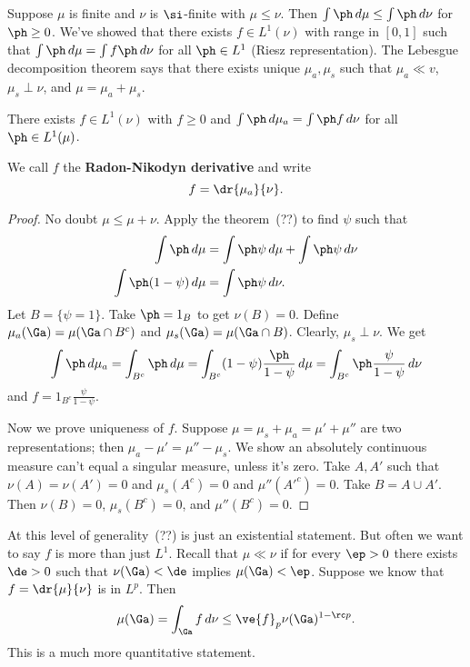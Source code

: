 
\subsection{}
Suppose $\mu$ is finite and $\nu$ is $\si$-finite with $\mu\le \nu$. Then $\int \ph\,d\mu\le \int \ph \,d\nu$ for $\ph\ge 0$. We've showed that there exists $f\in L^1(\nu)$ with range in $[0,1]$ such that $\int \ph\,d\mu=\int f\ph \,d\nu$ for all $\ph\in L^1$ (Riesz representation). The Lebesgue decomposition theorem says that there exists unique $\mu_a,\mu_s$ such that $\mu_a\ll v$, $\mu_s\perp \nu$, and $\mu=\mu_a+\mu_s$. 
\begin{thm}
There exists $f\in L^1(\nu)$ with $f\ge 0$ and $\int \ph\,d\mu_a=\int \ph f\,d\nu$ for all $\ph \in L^1(\mu)$.
\end{thm}
\begin{df}We call $f$ the \textbf{Radon-Nikodyn derivative} and write
\[
f=\dr{\mu_a}{\nu}.
\]
\end{df}
\begin{proof}
No doubt $\mu\le \mu+\nu$. Apply the theorem~(??) to find $\psi$ such that 
\begin{align*}
\int \ph \,d\mu&=\int \ph \psi\,d\mu+\int \ph \psi\,d\nu\\
\int \ph(1-\psi)\,d\mu&=\int \ph\psi\,d\nu.
\end{align*}
Let $B=\{\psi=1\}$. Take $\ph=1_B$ to get $\nu(B)=0$. Define $\mu_a(\Ga)=\mu(\Ga\cap B^c)$ and $\mu_s(\Ga)=\mu(\Ga \cap B)$. Clearly, $\mu_s\perp \nu$. We get 
\[\int\ph \,d\mu_a=\int_{B^c} \ph\,d\mu=\int_{B^c} (1-\psi)\frac{\ph}{1-\psi}\,d\mu=\int_{B^c} \ph \frac{\psi}{1-\psi}\,d\nu\]
and $f=1_{B^c}\frac{\psi}{1-\psi}$.

Now we prove uniqueness of $f$. Suppose $\mu=\mu_s+\mu_a=\mu'+\mu''$ are two representations; then $\mu_a-\mu'=\mu''-\mu_s$. We show an absolutely continuous measure can't equal a singular measure, unless it's zero. Take $A,A'$ such that $\nu(A)=\nu(A')=0$ and $\mu_s(A^c)=0$ and $\mu''(A'^c)=0$. Take $B=A\cup A'$. Then
$
\nu(B)=0$, $\mu_s(B^c)=0$, and $\mu''(B^c)=0$.
\end{proof}
At this level of generality~(??) is just an existential statement. But often we 
want to say $f$ is more than just $L^1$. Recall that $\mu\ll \nu$ if for every $\ep>0$ there exists $\de>0$ such that $\nu(\Ga)<\de$ implies $\mu(\Ga)<\ep$. Suppose we know that $f=\dr{\mu}{\nu}$ is in $L^p$. Then
\[
\mu(\Ga)=\int_{\Ga} f\,d\nu
\le \ve{f}_p\nu(\Ga)^{1-\rc p}.\]
This is a much more quantitative statement.

